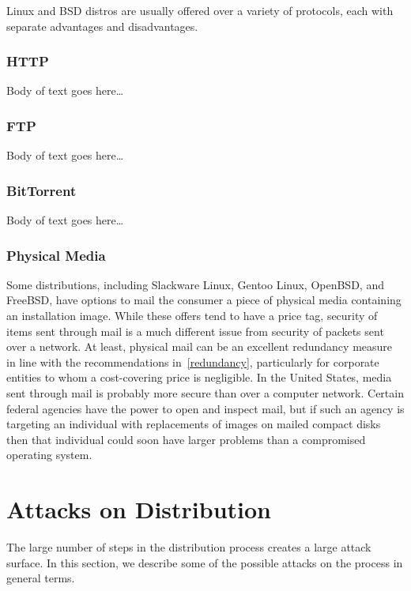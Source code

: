 \documentclass[conference]{IEEEtran}
\begin{document}
Linux and BSD distros are usually offered over a variety of protocols,
each with separate advantages and disadvantages.

\subsubsection{HTTP}

Body of text goes here\ldots

\subsubsection{FTP}

Body of text goes here\ldots

\subsubsection{BitTorrent}

Body of text goes here\ldots

\subsubsection{Physical Media}

Some distributions, including Slackware Linux, Gentoo Linux, OpenBSD, and FreeBSD,
have options to mail the consumer a piece of physical media containing an installation
image. While these offers tend to have a price tag, security of items sent through mail
is a much different issue from security of packets sent over a network. At least, physical
mail can be an excellent redundancy measure in line with the recommendations
in~\ref{redundancy}, particularly for corporate entities to whom a cost-covering price is
negligible. In the United States, media sent through mail is probably more secure
than over a computer network. Certain federal agencies have the power to open and inspect
mail, but if such an agency is targeting an individual with replacements of images on
mailed compact disks then that individual could soon have larger problems than a
compromised operating system.

\section{Attacks on Distribution}

The large number of steps in the distribution process creates a large attack surface. In this
section, we describe some of the possible attacks on the process in general terms.
\end{document}

